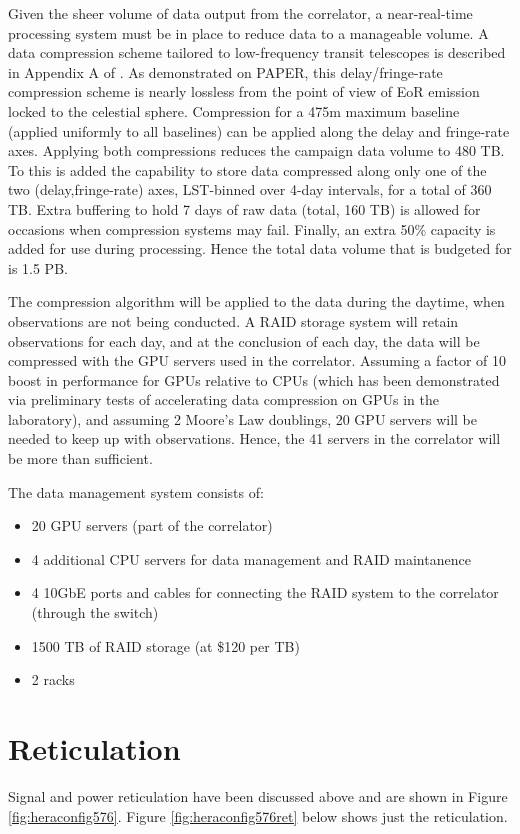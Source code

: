 \documentclass[11pt]{article}
\begin{document}
Given the sheer volume of data output from the correlator, a near-real-time processing system must
be in place to reduce data to a manageable volume.  A data compression scheme tailored to low-frequency
transit telescopes is described in Appendix A of \citet{parsons_et_al2013}.
As demonstrated on PAPER, this delay/fringe-rate compression scheme is nearly lossless from
the point of view of EoR emission locked to the celestial sphere.  Compression for a 475m maximum baseline
(applied uniformly to all baselines) can be applied along the delay and fringe-rate axes.  Applying both
compressions reduces the campaign data volume to 480 TB.  To this is added the capability to store
data compressed along only one of the two (delay,fringe-rate) axes, LST-binned over 4-day intervals, for a
total of 360 TB.  Extra buffering to hold 7 days of raw data (total, 160 TB) is allowed for
occasions when compression systems may fail.  Finally, an extra 50\% capacity is added for use during
processing.  Hence the total data volume that is budgeted for is 1.5 PB.

The compression algorithm will
be applied to the data during the daytime, when observations are not being conducted.  A RAID storage
system will retain observations for each day, and at the conclusion of each day, the data will be
compressed with the GPU servers used in the correlator.  Assuming a factor of 10 boost in performance
for GPUs relative to CPUs (which has been demonstrated via preliminary tests of accelerating data
compression on GPUs in the laboratory), and assuming 2 Moore's Law doublings, 20 GPU servers will be needed
to keep up with observations.  Hence, the 41 servers in the correlator will be more than sufficient.

The data management system consists of:
\begin{itemize}
\item 20 GPU servers (part of the correlator)
\item 4 additional CPU servers for data management and RAID maintanence
\item 4 10GbE ports and cables for connecting the RAID system to the correlator (through the switch)
\item 1500 TB of RAID storage (at \$120 per TB)
\item 2 racks
\end{itemize}

\section{Reticulation}
Signal and power reticulation have been discussed above and are shown in Figure \ref{fig:heraconfig576}.  Figure \ref{fig:heraconfig576ret} below shows just the reticulation.
\end{document}
